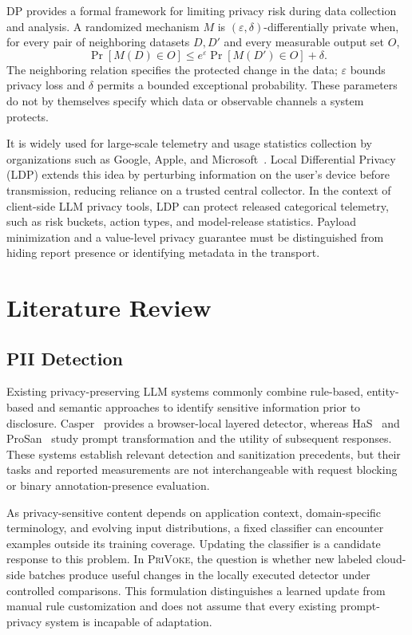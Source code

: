 \documentclass[conference]{IEEEtran}
\newcommand{\privoke}{\textsc{PriVoke}\xspace}
\begin{document}
DP provides a formal framework for limiting privacy risk during data collection and analysis. A randomized mechanism $M$ is $(\varepsilon,\delta)$-differentially private when, for every pair of neighboring datasets $D,D'$ and every measurable output set $O$,
\begin{equation}
\Pr[M(D)\in O] \leq e^{\varepsilon}\Pr[M(D')\in O]+\delta.
\end{equation}
The neighboring relation specifies the protected change in the data; $\varepsilon$ bounds privacy loss and $\delta$ permits a bounded exceptional probability. These parameters do not by themselves specify which data or observable channels a system protects.

It is widely used for large-scale telemetry and usage statistics collection by organizations such as Google, Apple, and Microsoft~\cite{cormode2018privacy, cortes2016differential}. Local Differential Privacy (LDP) extends this idea by perturbing information on the user's device before transmission, reducing reliance on a trusted central collector. In the context of client-side LLM privacy tools, LDP can protect released categorical telemetry, such as risk buckets, action types, and model-release statistics. Payload minimization and a value-level privacy guarantee must be distinguished from hiding report presence or identifying metadata in the transport.

\section{Literature Review}
\label{sec:literature_review}

\subsection{PII Detection}

Existing privacy-preserving LLM systems commonly combine rule-based, entity-based and semantic approaches to identify sensitive information prior to disclosure. Casper~\cite{Casper2024} provides a browser-local layered detector, whereas HaS~\cite{HaS2024} and ProSan~\cite{ProSan2024} study prompt transformation and the utility of subsequent responses. These systems establish relevant detection and sanitization precedents, but their tasks and reported measurements are not interchangeable with request blocking or binary annotation-presence evaluation.

As privacy-sensitive content depends on application context, domain-specific terminology, and evolving input distributions, a fixed classifier can encounter examples outside its training coverage. Updating the classifier is a candidate response to this problem. In \privoke, the question is whether new labeled cloud-side batches produce useful changes in the locally executed detector under controlled comparisons. This formulation distinguishes a learned update from manual rule customization and does not assume that every existing prompt-privacy system is incapable of adaptation.
\end{document}
